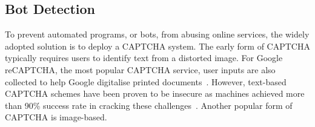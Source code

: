 \subsection{Bot Detection}

To prevent automated programs, or bots, from abusing online services, the widely adopted solution is to deploy a CAPTCHA system. The early form of CAPTCHA typically requires users to identify text from a distorted image. For Google reCAPTCHA, the most popular CAPTCHA service, user inputs are also collected to help Google digitalise printed documents~\cite{von2008recaptcha}. However, text-based CAPTCHA schemes have been proven to be insecure as machines achieved more than 90\% success rate in cracking these challenges~\cite{von2008recaptcha,yan2008low,5395072}. Another popular form of CAPTCHA is image-based.